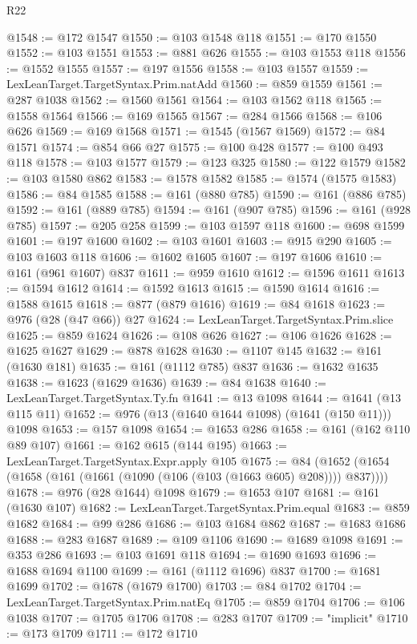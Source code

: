 \begin{lexlean}{R22}
\begin{coremodule}
{{{{{{{{{{{{{{{{{{{{{{{{{{{{{{{{{{{{{{{{{{{{{{{{{{{{@1548 := @172 @1547
@1550 := @103 @1548 @118
@1551 := @170 @1550
@1552 := @103 @1551
@1553 := @881 @626
@1555 := @103 @1553 @118
@1556 := @1552 @1555
@1557 := @197 @1556
@1558 := @103 @1557
@1559 := LexLeanTarget.TargetSyntax.Prim.natAdd
@1560 := @859 @1559
@1561 := @287 @1038
@1562 := @1560 @1561
@1564 := @103 @1562 @118
@1565 := @1558 @1564
@1566 := @169 @1565
@1567 := @284 @1566
@1568 := @106 @626
@1569 := @169 @1568
@1571 := @1545 (@1567 @1569)
@1572 := @84 @1571
@1574 := @854 @66 @27
@1575 := @100 @428
@1577 := @100 @493 @118
@1578 := @103 @1577
@1579 := @123 @325
@1580 := @122 @1579
@1582 := @103 @1580 @862
@1583 := @1578 @1582
@1585 := @1574 (@1575 @1583)
@1586 := @84 @1585
@1588 := @161 (@880 @785)
@1590 := @161 (@886 @785)
@1592 := @161 (@889 @785)
@1594 := @161 (@907 @785)
@1596 := @161 (@928 @785)
@1597 := @205 @258
@1599 := @103 @1597 @118
@1600 := @698 @1599
@1601 := @197 @1600
@1602 := @103 @1601
@1603 := @915 @290
@1605 := @103 @1603 @118
@1606 := @1602 @1605
@1607 := @197 @1606
@1610 := @161 (@961 @1607) @837
@1611 := @959 @1610
@1612 := @1596 @1611
@1613 := @1594 @1612
@1614 := @1592 @1613
@1615 := @1590 @1614
@1616 := @1588 @1615
@1618 := @877 (@879 @1616)
@1619 := @84 @1618
@1623 := @976 (@28 (@47 @66)) @27
@1624 := LexLeanTarget.TargetSyntax.Prim.slice
@1625 := @859 @1624
@1626 := @108 @626
@1627 := @106 @1626
@1628 := @1625 @1627
@1629 := @878 @1628
@1630 := @1107 @145
@1632 := @161 (@1630 @181)
@1635 := @161 (@1112 @785) @837
@1636 := @1632 @1635
@1638 := @1623 (@1629 @1636)
@1639 := @84 @1638
@1640 := LexLeanTarget.TargetSyntax.Ty.fn
@1641 := @13 @1098
@1644 := @1641 (@13 @115 @11)
@1652 := @976 (@13 (@1640 @1644 @1098) (@1641 (@150 @11))) @1098
@1653 := @157 @1098
@1654 := @1653 @286
@1658 := @161 (@162 @110 @89 @107)
@1661 := @162 @615 (@144 @195)
@1663 := LexLeanTarget.TargetSyntax.Expr.apply @105
@1675 := @84 (@1652 (@1654 (@1658 (@161 (@1661 (@1090 (@106 (@103 (@1663 @605) @208)))) @837))))
@1678 := @976 (@28 @1644) @1098
@1679 := @1653 @107
@1681 := @161 (@1630 @107)
@1682 := LexLeanTarget.TargetSyntax.Prim.equal
@1683 := @859 @1682
@1684 := @99 @286
@1686 := @103 @1684 @862
@1687 := @1683 @1686
@1688 := @283 @1687
@1689 := @109 @1106
@1690 := @1689 @1098
@1691 := @353 @286
@1693 := @103 @1691 @118
@1694 := @1690 @1693
@1696 := @1688 @1694 @1100
@1699 := @161 (@1112 @1696) @837
@1700 := @1681 @1699
@1702 := @1678 (@1679 @1700)
@1703 := @84 @1702
@1704 := LexLeanTarget.TargetSyntax.Prim.natEq
@1705 := @859 @1704
@1706 := @106 @1038
@1707 := @1705 @1706
@1708 := @283 @1707
@1709 := "implicit"
@1710 := @173 @1709
@1711 := @172 @1710
}}}}}}}}}}}}}}}}}}}}}}}}}}}}}}}}}}}}}}}}}}}}}}}}}}}}
\end{coremodule}
\end{lexlean}

